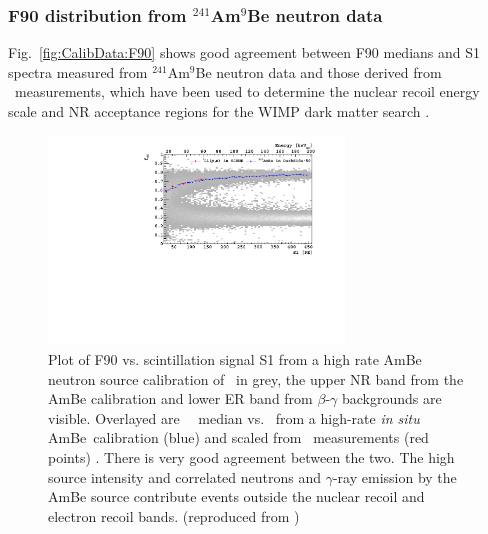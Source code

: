 \subsubsection{F90 distribution from $^{241}$Am$^9$Be neutron data}\label{sec:CalibData:NR}

Fig.~\ref{fig:CalibData:F90} shows good agreement between F90 medians and S1 spectra measured from $^{241}$Am$^9$Be neutron data and those derived from \SCENE\ measurements, which have been used to determine the nuclear recoil energy scale and NR acceptance regions for the WIMP dark matter search \cite{ds:ds-50-PLB, DS:2ndPaper}.
\begin{figure}[htbp]
\centering
\includegraphics[width=0.7\textwidth]{./Figures/DSf-UArAmBeDMSStCut.pdf}
\caption{Plot of F90 vs. scintillation signal S1 from a high rate AmBe neutron source calibration of \dsf\ in grey, the upper NR band from the AmBe calibration and lower ER band from $\beta$-$\gamma$ backgrounds are visible. Overlayed are \FNinety\ \NR\ median vs. \SOne\ from a high-rate {\it in situ} AmBe\ calibration (blue) and scaled from \SCENE\ measurements (red points) \cite{scene2}. There is very good agreement between the two.  The high source intensity and correlated neutrons and $\gamma$-ray emission by the AmBe source contribute events outside the nuclear recoil and electron recoil bands. (reproduced from \cite{DS:2ndPaper})\label{fig:CalibData:F90}\label{fig:DSf-UArAmBeDMS}} 
\end{figure}


